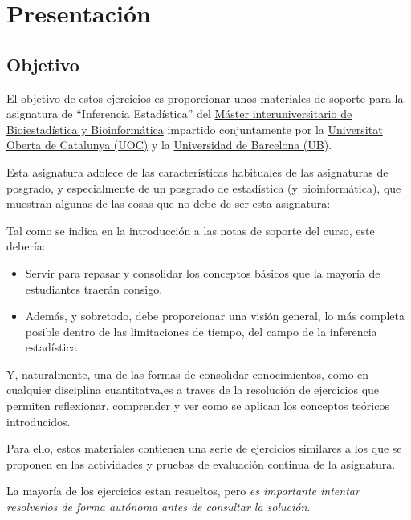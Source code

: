 \documentclass[
]{article}
\author{}
\date{\vspace{-2.5em}}
\providecommand{\tightlist}{%
  \setlength{\itemsep}{0pt}\setlength{\parskip}{0pt}}
\begin{document}
{
\setcounter{tocdepth}{2}
\tableofcontents
}
\section*{Presentación}\label{presentaciuxf3n}

\subsection*{Objetivo}\label{objetivo}

El objetivo de estos ejercicios es proporcionar unos materiales de soporte para la asignatura de ``Inferencia Estadística'' del \href{https://www.uoc.edu/es/estudios/masters/master-universitario-bioinformatica-bioestadistica}{Máster interuniversitario de Bioiestadística y Bioinformática} impartido conjuntamente por la \href{https://www.uoc.edu}{Universitat Oberta de Catalunya (UOC)} y la \href{https://www.ub.edu}{Universidad de Barcelona (UB)}.

Esta asignatura adolece de las características habituales de las asignaturas de posgrado, y especialmente de un posgrado de estadística (y bioinformática), que muestran algunas de las cosas que no debe de ser esta asignatura:

Tal como se indica en la introducción a las notas de soporte del curso, este debería:

\begin{itemize}
\tightlist
\item
  Servir para repasar y consolidar los conceptos básicos que la mayoría de estudiantes traerán consigo.
\item
  Además, y sobretodo, debe proporcionar una visión general, lo más completa posible dentro de las limitaciones de tiempo, del campo de la inferencia estadística
\end{itemize}

Y, naturalmente, una de las formas de consolidar conocimientos, como en cualquier disciplina cuantitatva,es a traves de la resolución de ejercicios que permiten reflexionar, comprender y ver como se aplican los conceptos teóricos introducidos.

Para ello, estos materiales contienen una serie de ejercicios similares a los que se proponen en las actividades y pruebas de evaluación continua de la asignatura.

La mayoría de los ejercicios estan resueltos, pero \emph{es importante intentar resolverlos de forma autónoma antes de consultar la solución}.
\end{document}
